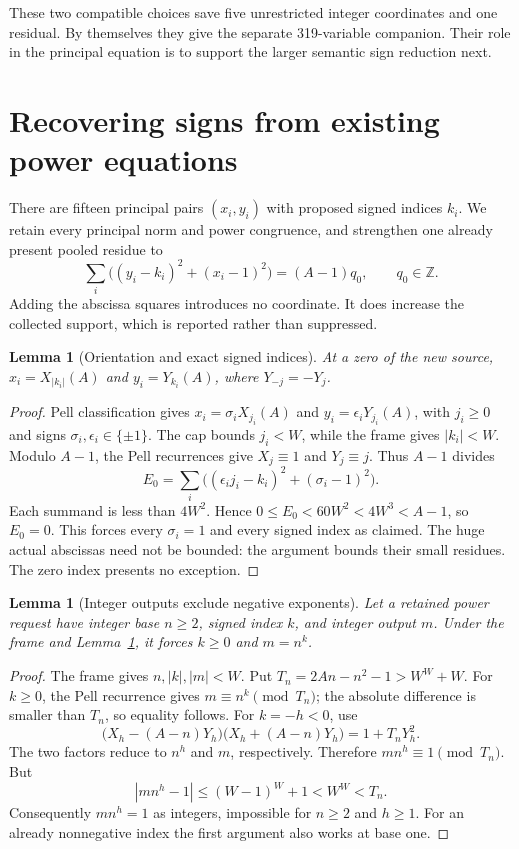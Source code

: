 \documentclass[11pt]{article}
\newtheorem{lemma}[theorem]{Lemma}
\theoremstyle{remark}\newtheorem{remark}[theorem]{Remark}
\newcommand{\Z}{\mathbb Z}\newcommand{\N}{\mathbb N}
\begin{document}
These two compatible choices save five unrestricted integer coordinates
and one residual. By themselves they give the separate 319-variable
companion. Their role in the principal equation is to support the larger
semantic sign reduction next.

\section{Recovering signs from existing power equations}\label{sec:signs}

There are fifteen principal pairs $(x_i,y_i)$ with proposed signed indices
$k_i$. We retain every principal norm and power congruence, and strengthen
one already present pooled residue to
\begin{equation}\label{eq:pooled}
 \sum_i\bigl((y_i-k_i)^2+(x_i-1)^2\bigr)=(A-1)q_0,
 \qquad q_0\in\Z.
\end{equation}
Adding the abscissa squares introduces no coordinate. It does increase
the collected support, which is reported rather than suppressed.

\begin{lemma}[Orientation and exact signed indices]\label{lem:orientation}
At a zero of the new source,
$x_i=X_{|k_i|}(A)$ and $y_i=Y_{k_i}(A)$, where
$Y_{-j}=-Y_j$.
\end{lemma}
\begin{proof}
Pell classification gives
$x_i=\sigma_iX_{j_i}(A)$ and $y_i=\epsilon_iY_{j_i}(A)$,
with $j_i\ge0$ and signs $\sigma_i,\epsilon_i\in\{\pm1\}$.
The cap bounds $j_i<W$, while the frame gives $|k_i|<W$.
Modulo $A-1$, the Pell recurrences give $X_j\equiv1$ and $Y_j\equiv j$.
Thus $A-1$ divides
\[
 E_0=\sum_i\bigl((\epsilon_i j_i-k_i)^2+(\sigma_i-1)^2\bigr).
\]
Each summand is less than $4W^2$. Hence
$0\le E_0<60W^2<4W^3<A-1$, so $E_0=0$.
This forces every $\sigma_i=1$ and every signed index as claimed.
The huge actual abscissas need not be bounded: the argument bounds their
small residues. The zero index presents no exception.
\end{proof}

\begin{lemma}[Integer outputs exclude negative exponents]\label{lem:negative}
Let a retained power request have integer base $n\ge2$, signed index $k$,
and integer output $m$. Under the frame and
Lemma~\ref{lem:orientation}, it forces $k\ge0$ and $m=n^k$.
\end{lemma}
\begin{proof}
The frame gives $n,|k|,|m|<W$. Put $T_n=2An-n^2-1>W^W+W$.
For $k\ge0$, the Pell recurrence gives $m\equiv n^k\pmod{T_n}$;
the absolute difference is smaller than $T_n$, so equality follows.
For $k=-h<0$, use
\[
 \bigl(X_h-(A-n)Y_h\bigr)\bigl(X_h+(A-n)Y_h\bigr)
 =1+T_nY_h^2.
\]
The two factors reduce to $n^h$ and $m$, respectively. Therefore
$mn^h\equiv1\pmod{T_n}$. But
\[
 |mn^h-1|\le(W-1)^W+1<W^W<T_n.
\]
Consequently $mn^h=1$ as integers, impossible for $n\ge2$ and $h\ge1$.
For an already nonnegative index the first argument also works at base one.
\end{proof}
\end{document}

